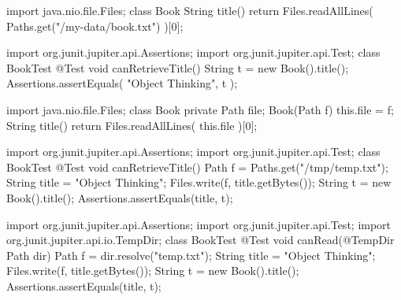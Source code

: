 \documentclass{article}
\begin{document}
\begin{lnSnippet}
import java.nio.file.Files;
class Book {
  String title() {
    return Files.readAllLines(
      Paths.get("/my-data/book.txt")
    )[0];
  }
}
\end{lnSnippet}
\begin{lnSnippet}
import org.junit.jupiter.api.Assertions;
import org.junit.jupiter.api.Test;
class BookTest {
  @Test
  void canRetrieveTitle() {
    String t = new Book().title();
    Assertions.assertEquals(
      "Object Thinking", t
    );
  }
}
\end{lnSnippet}

\begin{lnSnippet}
import java.nio.file.Files;
class Book {
  private Path file;
  Book(Path f) {
    this.file = f;
  }
  String title() {
    return Files.readAllLines(
      this.file
    )[0];
  }
}
\end{lnSnippet}
\begin{lnSnippet}
import org.junit.jupiter.api.Assertions;
import org.junit.jupiter.api.Test;
class BookTest {
  @Test
  void canRetrieveTitle() {
    Path f = Paths.get("/tmp/temp.txt");
    String title = "Object Thinking";
    Files.write(f, title.getBytes());
    String t = new Book().title();
    Assertions.assertEquals(title, t);
  }
}
\end{lnSnippet}

\begin{lnSnippet}
import org.junit.jupiter.api.Assertions;
import org.junit.jupiter.api.Test;
import org.junit.jupiter.api.io.TempDir;
class BookTest {
  @Test
  void canRead(@TempDir Path dir) {
    Path f = dir.resolve("temp.txt");
    String title = "Object Thinking";
    Files.write(f, title.getBytes());
    String t = new Book().title();
    Assertions.assertEquals(title, t);
  }
}
\end{lnSnippet}
\end{document}
